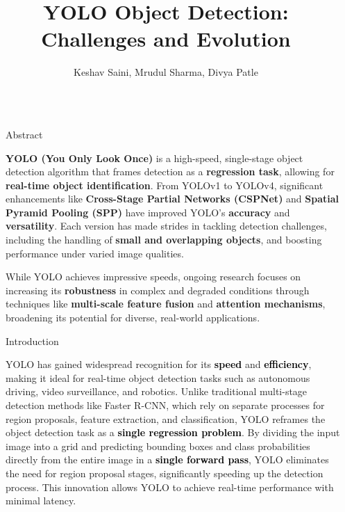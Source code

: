 \documentclass[final]{beamer}
\title{\textbf{YOLO Object Detection: Challenges and Evolution}}
\author{Keshav Saini, Mrudul Sharma, Divya Patle}
\institute[IIITN]{Indian Institute of Information Technology, Nagpur}
\newlength{\sepwidth}
\newlength{\colwidth}
\newcommand{\separatorcolumn}{\begin{column}{\sepwidth}\end{column}}
\begin{document}
\begin{frame}[t]
\begin{columns}[t]
\separatorcolumn

\begin{column}{\colwidth}
\begin{block}{Abstract}
    \vspace{0.6cm} %


    \textbf{YOLO (You Only Look Once)} is a high-speed, single-stage object detection algorithm that frames detection as a \textbf{regression task}, allowing for \textbf{real-time object identification}. From YOLOv1 to YOLOv4, significant enhancements like \textbf{Cross-Stage Partial Networks (CSPNet)} and \textbf{Spatial Pyramid Pooling (SPP)} have improved YOLO’s \textbf{accuracy} and \textbf{versatility}. Each version has made strides in tackling detection challenges, including the handling of \textbf{small and overlapping objects}, and boosting performance under varied image qualities.

    \vspace{0.3cm} %

    While YOLO achieves impressive speeds, ongoing research focuses on increasing its \textbf{robustness} in complex and degraded conditions through techniques like \textbf{multi-scale feature fusion} and \textbf{attention mechanisms}, broadening its potential for diverse, real-world applications.

    \vspace{0.2cm} %
\end{block}



  
\begin{block}{Introduction}
    \vspace{0.6cm} %
    
    YOLO has gained widespread recognition for its \textbf{\textcolor{black}{speed}} and \textbf{\textcolor{black}{efficiency}}, making it ideal for real-time object detection tasks such as autonomous driving, video surveillance, and robotics. Unlike traditional multi-stage detection methods like Faster R-CNN, which rely on separate processes for region proposals, feature extraction, and classification, YOLO reframes the object detection task as a \textbf{\textcolor{black}{single regression problem}}. By dividing the input image into a grid and predicting bounding boxes and class probabilities directly from the entire image in a \textbf{\textcolor{black}{single forward pass}}, YOLO eliminates the need for region proposal stages, significantly speeding up the detection process. This innovation allows YOLO to achieve real-time performance with minimal latency. 


\end{block}
\end{column}
\end{columns}
\end{frame}
\end{document}

